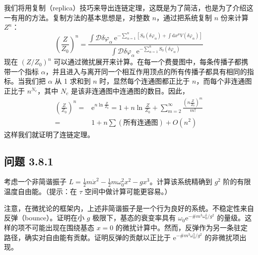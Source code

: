我们将用复制（replica）技巧来导出连链定理，这既是为了简洁，也是为了介绍这一有用的方法。复制方法的基本思想是，对整数 $n$，通过把系统复制 $n$ 份来计算 $Z^{n}$：
\begin{equation*}
\left(\frac{Z}{Z_{0}}\right)^{n} = \frac{\int\mathcal{D}\delta\varphi_{\alpha}\ \mathrm{e}^{-\sum_{\alpha=1}^{n}\left[S_{0}(\delta\varphi_{\alpha}) + \int \mathrm{d}x^{\mu}V(\delta\varphi_{\alpha})\right]}}{\int\mathcal{D}\delta\varphi_{\alpha}\ \mathrm{e}^{-\sum_{\alpha=1}^{n}S_{0}(\delta\varphi_{\alpha})}}
\end{equation*}
现在 $(Z/Z_{0})^{n}$ 可以通过微扰展开来计算。在每一个费曼图中，每条传播子都携带一个指标 $\alpha$，并且进入与离开同一个相互作用顶点的所有传播子都具有相同的指标。当我们把 $\alpha$ 从 1 求和到 $n$ 时，显然每个连通图都正比于 $n$，而每个非连通图正比于 $n^{N_{c}}$，其中 $N_{c}$ 是该非连通图中连通图的数目。因此，
\begin{align*}
\left(\frac{Z}{Z_{0}}\right)^{n} ={}& \mathrm{e}^{n\ln\frac{Z}{Z_{0}}} = 1 + n\ln\frac{Z}{Z_{0}} + \sum_{m=2}^{\infty}\frac{(n\frac{Z}{Z_{0}})^{m}}{m!}\\
={}& 1 + n\sum(\text{所有连通图}) + O(n^{2})
\end{align*}
这样我们就证明了连链定理。

\subsection*{问题 3.8.1}
考虑一个非简谐振子 $L=\frac{1}{2}m\dot{x}^{2}-\frac{1}{2}m\omega_{0}^{2}x^{2}-gx^{3}$。计算该系统精确到 $g^{2}$ 阶的有限温度自由能。（提示：在 $\tau$ 空间中做计算可能更容易。）

注意，在微扰论的框架内，上述非简谐振子是一个行为良好的系统。不稳定性来自反弹（bounce）。证明在小 $g$ 极限下，基态的衰变率具有 $\omega_{0}\mathrm{e}^{-\#m^{3}\omega_{0}^{5}/g^{2}}$ 的量级。这样的项不可能出现在围绕基态 $x=0$ 的微扰计算中。然而，反弹作为另一条驻定路径，确实对自由能有贡献。证明反弹的贡献以正比于 $\mathrm{e}^{-\#m^{3}\omega_{0}^{5}/g^{2}}$ 的非微扰项出现。


